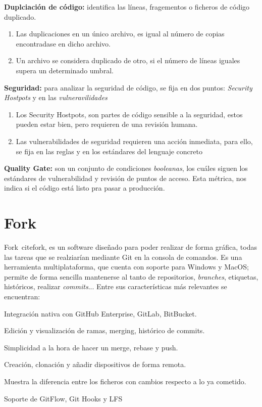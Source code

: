 \begin{list}{\textbullet}{ %
    \addtolength{\itemsep}{-2mm} %
    \setlength{\itemindent}{2mm}}

    \item \textbf{Duplciación de código:} identifica las líneas, fragementos o ficheros de código duplicado.
    \begin{enumerate}
        \item Las duplicaciones en un único archivo, es igual al número de copias encontradase en dicho archivo.
        \item Un archivo se considera duplicado de otro, si el número de líneas iguales supera un determinado umbral.
    \end{enumerate}
    \item \textbf{Seguridad:} para analizar la seguridad de código, se fija en dos puntos: \textit{Security Hostpots} y en las \textit{vulneravilidades}
    \begin{enumerate}
        \item Los Security Hostpots, son partes de código sensible a la seguridad, estos pueden estar bien, pero requieren de una revisión humana.
        \item Las vulnerabilidades de seguridad requieren una acción inmediata, para ello, se fija en las reglas  y en los estándares del lenguaje concreto
    \end{enumerate}
    \item \textbf{Quality Gate:} son un conjunto de condiciones \textit{booleanas}, los cuáles siguen los estándares de vulnerabilidad y revisión de puntos de acceso. Esta métrica, nos indica si el código está listo pra pasar a producción.
\end{list}

\section{Fork}
Fork\ cite{fork}, es un software diseñado para poder realizar de forma gráfica, todas las tareas que se realziarían mediante Git en la consola de comandos.
Es una herramienta multiplataforma, que cuenta con soporte para Windows y MacOS; permite de forma sencilla mantenerse al tanto de repositorios, \textit{branches}, etiquetas, históricos, realizar \textit{commits}... Entre sus características más relevantes se encuentran:
\begin{list}{\textbullet}{ %
    \addtolength{\itemsep}{-2mm} %
    \setlength{\itemindent}{2mm}}

    \item Integración nativa con GitHub Enterprise, GitLab, BitBucket.
    \item Edición y visualización de ramas, merging, histórico de commits.
    \item Simplicidad a la hora de hacer un merge, rebase y push.
    \item Creación, clonación y añadir dispositivos de forma remota.
    \item Muestra la diferencia entre los ficheros con cambios respecto a lo ya cometido.
    \item Soporte de GitFlow, Git Hooks y LFS
\end{list}